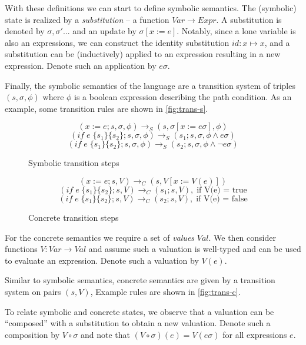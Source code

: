 \documentclass[submission,copyright,creativecommons]{eptcs}
\begin{document}
With these definitions we can start to define symbolic semantics. The (symbolic) state is realized by a
\emph{substitution} -- a function $Var \rightarrow Expr$. A substitution is denoted by $\sigma, \sigma'...$
and an update by $\sigma[x := e]$. Notably, since a lone variable is also an expressions, we can construct the
identity substitution $id : x \mapsto x$, and a substitution can be (inductively) applied to an expression resulting
in a new expression. Denote such an application by $e\sigma$.

Finally, the symbolic semantics of the language are a transition system of triples $(s, \sigma, \phi)$
where $\phi$ is a boolean expression describing the path condition. As an example, some transition rules
are shown in \autoref{fig:trans-s}.

\begin{figure}
  \centering
  \begin{minipage}[c]{0.4\linewidth}
  \[(x := e ; s, \sigma, \phi) \rightarrow_{S} (s, \sigma[x := e\sigma], \phi) \]
    \[(if \;e\; \{s_{1}\} \{s_{2}\} ; s, \sigma, \phi) \rightarrow_{S} (s_{1} ; s, \sigma, \phi \land e\sigma) \]
    \[(if \;e\; \{s_{1}\} \{s_{2}\} ; s, \sigma, \phi) \rightarrow_{S} (s_{2} ; s, \sigma, \phi \land \neg e\sigma) \]
    \caption{Symbolic transition steps}
    \label{fig:trans-s}
  \end{minipage}
  \hfill
  \begin{minipage}[c]{0.4\linewidth}
    \[(x := e ; s, V) \rightarrow_{C} (s, V[x := V(e)]) \]
    \[(if \;e\; \{s_{1}\} \{s_{2}\} ; s, V) \rightarrow_{C} (s_{1} ; s, V),\; \mbox{if V(e) = true} \]
    \[(if \;e\; \{s_{1}\} \{s_{2}\} ; s, V) \rightarrow_{C} (s_{2} ; s, V),\; \mbox{if V(e) = false} \]
    \caption{Concrete transition steps}
    \label{fig:trans-c}
  \end{minipage}
\end{figure}

For the concrete semantics we require a set of \emph{values} $Val$. We then consider functions $V : Var \rightarrow Val$
and assume such a valuation is well-typed and can be used to evaluate an expression. Denote such a valuation by $V(e)$.

Similar to symbolic semantics, concrete semantics are given by a transition system on pairs $(s, V)$,
Example rules are shown in \autoref{fig:trans-c}.

To relate symbolic and concrete states, we observe that a valuation can be ``composed'' with a substitution
to obtain a new valuation. Denote such a composition by $V \circ \sigma$ and note that $(V \circ \sigma)(e) = V(e\sigma)$
for all expressions $e$.
\end{document}

